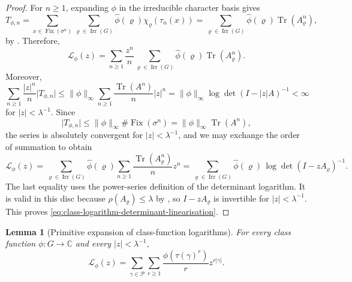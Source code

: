 \documentclass[11pt,a4paper]{amsart}
\theoremstyle{plain}
\newtheorem{lemma}[theorem]{Lemma}
\theoremstyle{definition}
\theoremstyle{remark}
\DeclareMathOperator{\Tr}{Tr}
\DeclareMathOperator{\Irr}{Irr}
\newcommand{\CC}{\mathbb{C}}
\newcommand{\cP}{\mathcal P}
\newcommand{\abs}[1]{\lvert #1 \rvert}
\newcommand{\norm}[1]{\lVert #1 \rVert}
\begin{document}
\begin{proof}
  For \(n\ge 1\), expanding \(\phi\) in the irreducible character basis
  gives
  \[
    T_{\phi,n}
    =\sum_{x\in\operatorname{Fix}(\sigma^n)}
      \sum_{\varrho\in\Irr(G)}
        \widehat\phi(\varrho)\chi_\varrho(\tau_n(x))
    =\sum_{\varrho\in\Irr(G)}
      \widehat\phi(\varrho)\Tr(A_\varrho^n),
  \]
  by . Therefore,
  \[
    \mathcal L_\phi(z)
    =\sum_{n\ge 1}\frac{z^n}{n}
      \sum_{\varrho\in\Irr(G)}
        \widehat\phi(\varrho)\Tr(A_\varrho^n).
  \]
  Moreover,
  \[
    \sum_{n\ge 1}\frac{|z|^n}{n}\abs{T_{\phi,n}}
    \le
    \norm{\phi}_\infty
    \sum_{n\ge 1}\frac{\Tr(A^n)}{n}|z|^n
    =
    \norm{\phi}_\infty \log\det(I-|z|A)^{-1}
    <\infty
  \]
  for \(|z|<\lambda^{-1}\). Since
  \[
    \abs{T_{\phi,n}}
    \le \norm{\phi}_\infty \#\operatorname{Fix}(\sigma^n)
    =\norm{\phi}_\infty \Tr(A^n),
  \]
  the series is absolutely convergent for \(|z|<\lambda^{-1}\), and we
  may exchange the order of summation to obtain
  \[
    \mathcal L_\phi(z)
    =
    \sum_{\varrho\in\Irr(G)}
      \widehat\phi(\varrho)
      \sum_{n\ge 1}\frac{\Tr(A_\varrho^n)}{n}z^n
    =
    \sum_{\varrho\in\Irr(G)}
      \widehat\phi(\varrho)\,
      \log\det(I-zA_\varrho)^{-1}.
  \]
  The last equality uses the power-series definition of the determinant
  logarithm. It is valid in this disc because
  \(\rho(A_\varrho)\le \lambda\) by
  , so
  \(I-zA_\varrho\) is invertible for \(|z|<\lambda^{-1}\).
  This proves \eqref{eq:class-logarithm-determinant-linearisation}.
\end{proof}


\begin{lemma}[Primitive expansion of class-function logarithms]
  \label{lem:class-logarithm-primitive-expansion}
  For every class function \(\phi:G\to\CC\) and every
  \(|z|<\lambda^{-1}\),
  \begin{equation}\label{eq:class-logarithm-primitive-expansion}
    \mathcal L_\phi(z)
    =
    \sum_{\gamma\in\cP}\sum_{r\ge 1}
      \frac{\phi(\tau(\gamma)^r)}{r}z^{r|\gamma|}.
  \end{equation}
\end{lemma}
\end{document}
